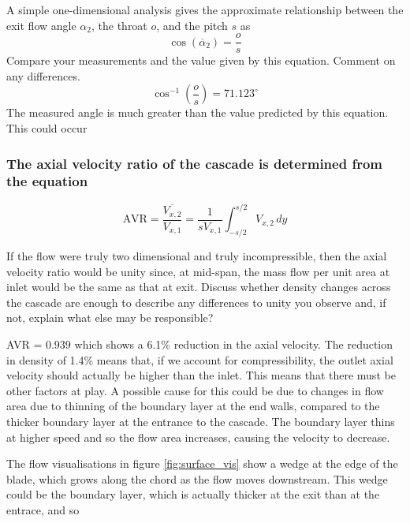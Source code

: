 \documentclass{article}
\begin{document}
% 


A simple one-dimensional analysis gives the approximate relationship between the exit flow angle $\alpha_2$, the throat $o$, and the pitch $s$ as
\begin{equation}
    \cos (\overline{\alpha}_2) = \frac{o}{s}
\end{equation}
Compare your measurements and the value given by this equation. Comment on any
differences.
\begin{equation}
    \cos^{-1}\left( \frac{o}{s} \right) = 71.123^\circ
\end{equation}
The measured angle is much greater than the value predicted by this equation.
This could occur 

\subsubsection{The axial velocity ratio of the cascade is determined from the equation
}
\begin{equation}
    \text{AVR} = \frac{\overline{V_{x,2}}}{V_{x,1}} = \frac{1}{s V_{x,1}} \int_{-s/2}^{s/2} V_{x,2} \, dy
\end{equation}

If the flow were truly two dimensional and truly incompressible, then the axial velocity ratio
would be unity since, at mid-span, the mass flow per unit area at inlet would be the same as
that at exit. Discuss whether density changes across the cascade are enough to describe any
differences to unity you observe and, if not, explain what else may be responsible?

AVR = $0.939$ which shows a 6.1\% reduction in the axial velocity.
The reduction in density of 1.4\% means that, if we account for compressibility, the outlet axial velocity should actually be higher than the inlet.
This means that there must be other factors at play.
A possible cause for this could be due to changes in flow area due to thinning of the boundary layer at the end walls, compared to the thicker boundary layer at the entrance to the cascade.
The boundary layer thins at higher speed and so the flow area increases, causing the velocity to decrease.

The flow visualisations in figure \ref{fig:surface_vis} show a wedge at the edge of the blade, which grows along the chord as the flow moves downstream.
This wedge could be the boundary layer, which is actually thicker at the exit than at the entrace, and so 
\end{document}
